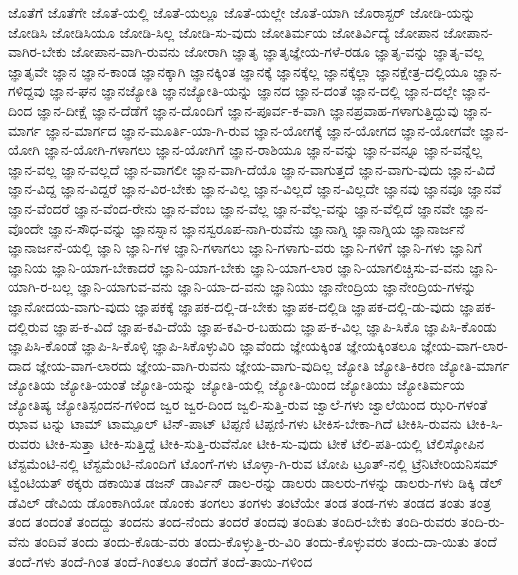 {ಜೊತೆಗೆ
ಜೊತೆಗೇ
ಜೊತೆ-ಯಲ್ಲಿ
ಜೊತೆ-ಯಲ್ಲೂ
ಜೊತೆ-ಯಲ್ಲೇ
ಜೊತೆ-ಯಾಗಿ
ಜೊರಾಸ್ಟರ್
ಜೋಡಿ-ಯನ್ನು
ಜೋಡಿಸಿ
ಜೋಡಿಸಿಯೂ
ಜೋಡಿ-ಸಿಲ್ಲ
ಜೋಡಿ-ಸು-ವುದು
ಜೋತಿರ್ಮಯ
ಜೋತಿರ್ವಿದ್ಯೆ
ಜೋಪಾನ
ಜೋಪಾನ-ವಾಗಿರ-ಬೇಕು
ಜೋಪಾನ-ವಾಗಿ-ರುವನು
ಜೋರಾಗಿ
ಜ್ಞಾತೃ
ಜ್ಞಾತೃಜ್ಞೇಯ-ಗಳೆ-ರಡೂ
ಜ್ಞಾತೃ-ವನ್ನು
ಜ್ಞಾತೃ-ವಲ್ಲ
ಜ್ಞಾತೃವೇ
ಜ್ಞಾನ
ಜ್ಞಾನ-ಕಾಂಡ
ಜ್ಞಾನಕ್ಕಾಗಿ
ಜ್ಞಾನಕ್ಕಿಂತ
ಜ್ಞಾನಕ್ಕೆ
ಜ್ಞಾನಕ್ಕೆಲ್ಲ
ಜ್ಞಾನಕ್ಕೆಲ್ಲಾ
ಜ್ಞಾನಕ್ಷೇತ್ರ-ದಲ್ಲಿಯೂ
ಜ್ಞಾನ-ಗಳಿದ್ದವು
ಜ್ಞಾನ-ಘನ
ಜ್ಞಾನಜ್ಯೋತಿ
ಜ್ಞಾನಜ್ಯೋತಿ-ಯನ್ನು
ಜ್ಞಾನದ
ಜ್ಞಾನ-ದಂತೆ
ಜ್ಞಾನ-ದಲ್ಲಿ
ಜ್ಞಾನ-ದಲ್ಲೇ
ಜ್ಞಾನ-ದಿಂದ
ಜ್ಞಾನ-ದೀಕ್ಷೆ
ಜ್ಞಾನ-ದೆಡೆಗೆ
ಜ್ಞಾನ-ದೊಂದಿಗೆ
ಜ್ಞಾನ-ಪೂರ್ವ-ಕ-ವಾಗಿ
ಜ್ಞಾನಪ್ರವಾಹ-ಗಳಾಗುತ್ತಿದ್ದುವು
ಜ್ಞಾನ-ಮಾರ್ಗ
ಜ್ಞಾನ-ಮಾರ್ಗದ
ಜ್ಞಾನ-ಮೂರ್ತಿ-ಯಾ-ಗಿ-ರುವ
ಜ್ಞಾನ-ಯೋಗಕ್ಕೆ
ಜ್ಞಾನ-ಯೋಗದ
ಜ್ಞಾನ-ಯೋಗವೇ
ಜ್ಞಾನ-ಯೋಗಿ
ಜ್ಞಾನ-ಯೋಗಿ-ಗಳಾಗಲು
ಜ್ಞಾನ-ಯೋಗಿಗೆ
ಜ್ಞಾನ-ರಾಶಿಯೂ
ಜ್ಞಾನ-ವನ್ನು
ಜ್ಞಾನ-ವನ್ನೂ
ಜ್ಞಾನ-ವನ್ನೆಲ್ಲ
ಜ್ಞಾನ-ವಲ್ಲ
ಜ್ಞಾನ-ವಲ್ಲದೆ
ಜ್ಞಾನ-ವಾಗಲೀ
ಜ್ಞಾನ-ವಾಗಿ-ದೆಯೊ
ಜ್ಞಾನ-ವಾಗುತ್ತದೆ
ಜ್ಞಾನ-ವಾಗು-ವುದು
ಜ್ಞಾನ-ವಿದೆ
ಜ್ಞಾನ-ವಿದ್ದ
ಜ್ಞಾನ-ವಿದ್ದರೆ
ಜ್ಞಾನ-ವಿರ-ಬೇಕು
ಜ್ಞಾನ-ವಿಲ್ಲ
ಜ್ಞಾನ-ವಿಲ್ಲದೆ
ಜ್ಞಾನ-ವಿಲ್ಲದೇ
ಜ್ಞಾನವು
ಜ್ಞಾನವೂ
ಜ್ಞಾನವೆ
ಜ್ಞಾನ-ವೆಂದರೆ
ಜ್ಞಾನ-ವೆಂದ-ರೇನು
ಜ್ಞಾನ-ವೆಂಬ
ಜ್ಞಾನ-ವೆಲ್ಲ
ಜ್ಞಾನ-ವೆಲ್ಲ-ವನ್ನು
ಜ್ಞಾನ-ವೆಲ್ಲಿದೆ
ಜ್ಞಾನವೇ
ಜ್ಞಾನ-ವೊಂದೇ
ಜ್ಞಾನ-ಸೌಧ-ವನ್ನು
ಜ್ಞಾನಸ್ನಾನ
ಜ್ಞಾನಸ್ವರೂಪ-ನಾಗಿ-ರುವೆನು
ಜ್ಞಾನಾಗ್ನಿ
ಜ್ಞಾನಾಗ್ನಿಯ
ಜ್ಞಾನಾರ್ಜನೆ
ಜ್ಞಾನಾರ್ಜನೆ-ಯಲ್ಲಿ
ಜ್ಞಾನಿ
ಜ್ಞಾನಿ-ಗಳ
ಜ್ಞಾನಿ-ಗಳಾಗಲು
ಜ್ಞಾನಿ-ಗಳಾಗು-ವರು
ಜ್ಞಾನಿ-ಗಳಿಗೆ
ಜ್ಞಾನಿ-ಗಳು
ಜ್ಞಾನಿಗೆ
ಜ್ಞಾನಿಯ
ಜ್ಞಾನಿ-ಯಾಗ-ಬೇಕಾದರೆ
ಜ್ಞಾನಿ-ಯಾಗ-ಬೇಕು
ಜ್ಞಾನಿ-ಯಾಗ-ಲಾರ
ಜ್ಞಾನಿ-ಯಾಗಲಿಚ್ಚಿಸು-ವ-ವನು
ಜ್ಞಾನಿ-ಯಾಗಿ-ರ-ಬಲ್ಲ
ಜ್ಞಾನಿ-ಯಾಗುವ-ವನು
ಜ್ಞಾನಿ-ಯಾ-ದ-ವನು
ಜ್ಞಾನಿಯು
ಜ್ಞಾನೇಂದ್ರಿಯ
ಜ್ಞಾನೇಂದ್ರಿಯ-ಗಳನ್ನು
ಜ್ಞಾನೋದಯ-ವಾಗು-ವುದು
ಜ್ಞಾಪಕಕ್ಕೆ
ಜ್ಞಾಪಕ-ದಲ್ಲಿ-ಡ-ಬೇಕು
ಜ್ಞಾಪಕ-ದಲ್ಲಿಡಿ
ಜ್ಞಾಪಕ-ದಲ್ಲಿ-ಡು-ವುದು
ಜ್ಞಾಪಕ-ದಲ್ಲಿರುವ
ಜ್ಞಾಪ-ಕ-ವಿದೆ
ಜ್ಞಾಪ-ಕವಿ-ದೆಯೆ
ಜ್ಞಾಪ-ಕವಿ-ರ-ಬಹುದು
ಜ್ಞಾಪ-ಕ-ವಿಲ್ಲ
ಜ್ಞಾಪಿ-ಸಿಕೊ
ಜ್ಞಾಪಿಸಿ-ಕೊಂಡು
ಜ್ಞಾಪಿಸಿ-ಕೊಂಡೆ
ಜ್ಞಾಪಿ-ಸಿ-ಕೊಳ್ಳಿ
ಜ್ಞಾಪಿ-ಸಿಕೊಳ್ಳುವಿರಿ
ಜ್ಞಾವೆಂದು
ಜ್ಞೇಯಕ್ಕಿಂತ
ಜ್ಞೇಯಕ್ಕಿಂತಲೂ
ಜ್ಞೇಯ-ವಾಗ-ಲಾರ-ದಾದ
ಜ್ಞೇಯ-ವಾಗ-ಲಾರದು
ಜ್ಞೇಯ-ವಾಗಿ-ರುವನು
ಜ್ಞೇಯ-ವಾಗು-ವುದಿಲ್ಲ
ಜ್ಯೋತಿ
ಜ್ಯೋತಿ-ಕಿರಣ
ಜ್ಯೋತಿ-ಮಾರ್ಗ
ಜ್ಯೋತಿಯ
ಜ್ಯೋತಿ-ಯಂತೆ
ಜ್ಯೋತಿ-ಯನ್ನು
ಜ್ಯೋತಿ-ಯಲ್ಲಿ
ಜ್ಯೋತಿ-ಯಿಂದ
ಜ್ಯೋತಿಯು
ಜ್ಯೋತಿರ್ಮಯ
ಜ್ಯೋತಿಷ್ಯ
ಜ್ಯೋತಿಸ್ಪಂದನ-ಗಳಿಂದ
ಜ್ವರ
ಜ್ವರ-ದಿಂದ
ಜ್ವಲಿ-ಸುತ್ತಿ-ರುವ
ಜ್ವಾಲೆ-ಗಳು
ಜ್ವಾಲೆಯಿಂದ
ಝರಿ-ಗಳಂತೆ
ಝಾವ
ಟನ್ನು
ಟಾಮ್
ಟಾಮ್ಪೂಲ್
ಟಿನ್-ಪಾಟ್
ಟಿಪ್ಪಣಿ
ಟಿಪ್ಪಣಿ-ಗಳು
ಟೀಕಿಸ-ಬೇಕಾ-ಗಿದೆ
ಟೀಕಿಸಿ-ರುವನು
ಟೀಕಿ-ಸಿ-ರುವರು
ಟೀಕಿ-ಸುತ್ತಾ
ಟೀಕಿ-ಸುತ್ತಿದ್ದೆ
ಟೀಕಿ-ಸುತ್ತಿ-ರುವೆನೋ
ಟೀಕಿ-ಸು-ವುದು
ಟೀಕೆ
ಟೆಲಿ-ಪತಿ-ಯಲ್ಲಿ
ಟೆಲಿಸ್ಕೋಪಿನ
ಟೆಸ್ಟಮೆಂಟಿ-ನಲ್ಲಿ
ಟೆಸ್ಟಮೆಂಟಿ-ನೊಂದಿಗೆ
ಟೊಂಗೆ-ಗಳು
ಟೊಳ್ಳಾ-ಗಿ-ರುವ
ಟೋಪಿ
ಟ್ರೂತ್-ನಲ್ಲಿ
ಟ್ರೆನಿಟೇರಿಯನಿಸಮ್
ಟ್ವೆಂಟಿಯತ್
ಠಕ್ಕರು
ಡಕಾಯಿತ
ಡಜನ್
ಡಾರ್ವಿನ್
ಡಾಲ-ರನ್ನು
ಡಾಲರು
ಡಾಲರು-ಗಳನ್ನು
ಡಾಲರು-ಗಳು
ಡಿಕ್ಕಿ
ಡೆಲ್
ಡೆವಿಲ್
ಡೇವಿಯ
ಡೊಂಕಾಗಿಯೋ
ಡೊಂಕು
ತಂಗಲು
ತಂಗಳು
ತಂಟೆಯೇ
ತಂಡ
ತಂಡ-ಗಳು
ತಂಡದ
ತಂತು
ತಂತ್ರ
ತಂದ
ತಂದಂತೆ
ತಂದದ್ದು
ತಂದನು
ತಂದ-ನೆಂದು
ತಂದರೆ
ತಂದವು
ತಂದಿತು
ತಂದಿರ-ಬೇಕು
ತಂದಿ-ರುವರು
ತಂದಿ-ರು-ವೆನು
ತಂದಿವೆ
ತಂದು
ತಂದು-ಕೊಡು-ವರು
ತಂದು-ಕೊಳ್ಳುತ್ತಿ-ರು-ವಿರಿ
ತಂದು-ಕೊಳ್ಳುವರು
ತಂದು-ದಾ-ಯಿತು
ತಂದೆ
ತಂದೆ-ಗಳು
ತಂದೆ-ಗಿಂತ
ತಂದೆ-ಗಿಂತಲೂ
ತಂದೆಗೆ
ತಂದೆ-ತಾಯಿ-ಗಳಿಂದ
}
